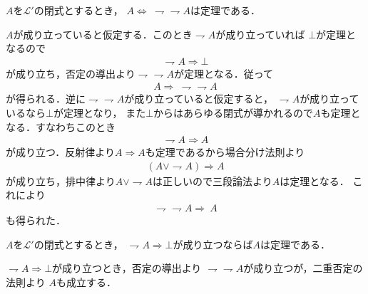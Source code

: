 	\begin{screen}
		\begin{metathm}[二重否定の法則]
			$A$を$\mathcal{L}'$の閉式とするとき，
			$A \Longleftrightarrow\ \rightharpoondown \rightharpoondown A$は定理である．
		\end{metathm}
	\end{screen}
	
	\begin{prf}
		$A$が成り立っていると仮定する．このとき$\rightharpoondown A$が成り立っていれば
		$\bot$が定理となるので
		\begin{align}
			\rightharpoondown A \Longrightarrow \bot
		\end{align}
		が成り立ち，否定の導出より$\rightharpoondown \rightharpoondown A$が定理となる．従って
		\begin{align}
			A \Longrightarrow\ \rightharpoondown \rightharpoondown A
		\end{align}
		が得られる．逆に$\rightharpoondown \rightharpoondown A$が成り立っていると仮定すると，
		$\rightharpoondown A$が成り立っているなら$\bot$が定理となり，
		また$\bot$からはあらゆる閉式が導かれるので$A$も定理となる．すなわちこのとき
		\begin{align}
			\rightharpoondown A \Longrightarrow A
		\end{align}
		が成り立つ．反射律より$A \Longrightarrow A$も定理であるから場合分け法則より
		\begin{align}
			(A \vee \rightharpoondown A) \Longrightarrow A
		\end{align}
		が成り立ち，排中律より$A \vee \rightharpoondown A$は正しいので三段論法より$A$は定理となる．
		これにより
		\begin{align}
			\rightharpoondown \rightharpoondown A \Longrightarrow\ A
		\end{align}
		も得られた．
		\QED
	\end{prf}
	
	\begin{screen}
		\begin{metathm}[背理法の原理]
			$A$を$\mathcal{L}'$の閉式とするとき，
			$\rightharpoondown A \Longrightarrow \bot$が成り立つならば$A$は定理である．
		\end{metathm}
	\end{screen}
	
	\begin{prf}
		$\rightharpoondown A \Longrightarrow \bot$が成り立つとき，否定の導出より
		$\rightharpoondown \rightharpoondown A$が成り立つが，二重否定の法則より
		$A$も成立する．
		\QED
	\end{prf}
	
